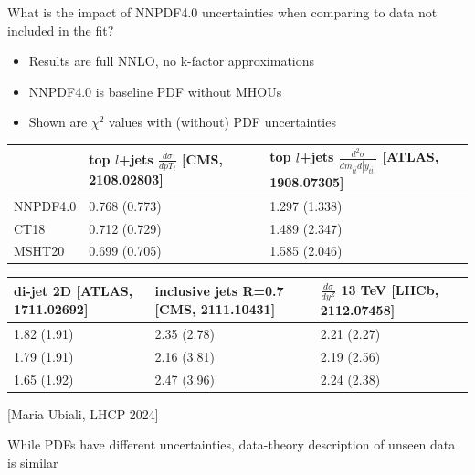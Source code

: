 \documentclass[aspectratio=43, 8pt,t]{beamer}
\begin{document}
\begin{frame}{What is the impact of NNPDF4.0 uncertainties when comparing to data not included in the fit?}
  \begin{itemize}
    \item Results are full NNLO, no k-factor approximations
    \item NNPDF4.0 is baseline PDF without MHOUs
    \item Shown are $\chi^2$ values with (without) PDF uncertainties
  \end{itemize}

  \begin{table}[]
    \footnotesize
    \begin{tabular}{@{}lll@{}}
    \toprule
             & top $l$+jets $\frac{d\sigma}{dpT_t}$ {\color{gray}\footnotesize [CMS, 2108.02803]}& top $l$+jets $\frac{d^2\sigma}{dm_{t\bar{t}}d|y_{t\bar{t}}|}$  {\color{gray}\footnotesize [ATLAS, 1908.07305]}\\ \midrule
    NNPDF4.0 & 0.768 (0.773)                            & 1.297 (1.338)                                                       \\
    CT18     & 0.712 (0.729)                            & 1.489 (2.347)                                                       \\
    MSHT20   & 0.699 (0.705)                            & 1.585 (2.046)                                                       \\ \bottomrule
    \end{tabular}
  \end{table}

  \begin{table}[]
    \footnotesize
    \begin{tabular}{@{}llll@{}}
    \toprule
    di-jet 2D {\color{gray}\footnotesize [ATLAS, 1711.02692]} & inclusive jets R=0.7 {\color{gray}\footnotesize [CMS, 2111.10431]}& $\frac{d\sigma}{dy^Z}$ 13 TeV {\color{gray}\footnotesize [LHCb, 2112.07458]}\\ \midrule
    1.82 (1.91)     & 2.35 (2.78)              & 2.21 (2.27)                        \\
    1.79 (1.91)     & 2.16 (3.81)              & 2.19 (2.56)                        \\
    1.65 (1.92)     & 2.47 (3.96)              & 2.24 (2.38)                        \\ \bottomrule
    \end{tabular}
  \end{table}


  \begin{center}
    {\color{gray}\footnotesize [Maria Ubiali, LHCP 2024]}
  \end{center}

  \vfill
  \begin{center}
    While PDFs have different uncertainties, data-theory description of unseen data is similar
  \end{center}

\end{frame}
\end{document}
